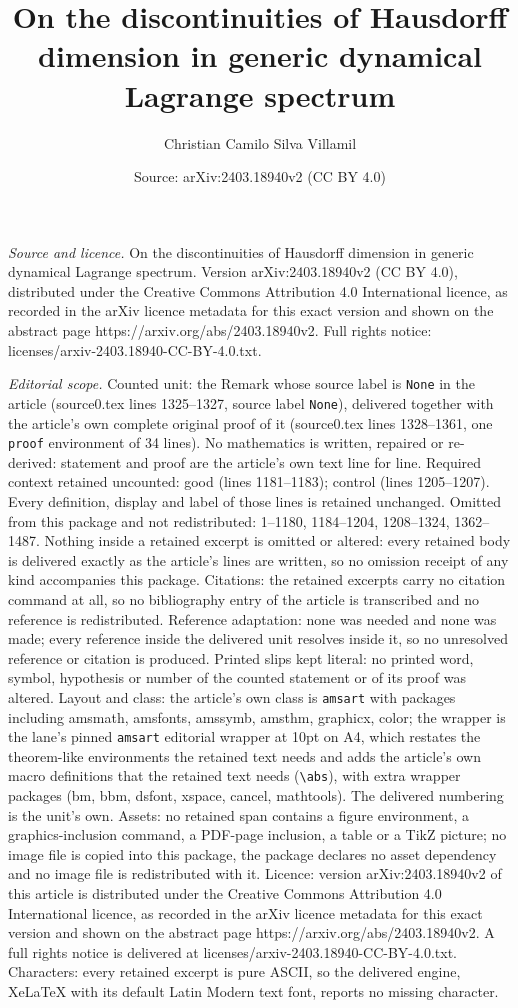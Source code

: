 \documentclass[10pt,a4paper]{amsart}
\title[On the discontinuities of Hausdorff dimension in generic dyn]{On the discontinuities of Hausdorff dimension in generic dynamical Lagrange spectrum}
\author{Christian Camilo Silva Villamil}
\date{Source: arXiv:2403.18940v2 (CC BY 4.0)}
\begin{document}
\maketitle

\noindent\emph{Source and licence.} On the discontinuities of Hausdorff dimension in generic dynamical Lagrange spectrum. Version arXiv:2403.18940v2 (CC BY 4.0), distributed under the Creative Commons Attribution 4.0 International licence, as recorded in the arXiv licence metadata for this exact version and shown on the abstract page https://arxiv.org/abs/2403.18940v2. Full rights notice: licenses/arxiv-2403.18940-CC-BY-4.0.txt.\par\smallskip

\noindent\textit{Editorial scope.} Counted unit: the Remark whose source label is \texttt{None} in the article (source0.tex lines 1325--1327, source label \texttt{None}), delivered together with the article's own complete original proof of it (source0.tex lines 1328--1361, one \texttt{proof} environment of 34 lines). No mathematics is written, repaired or re-derived: statement and proof are the article's own text line for line. Required context retained uncounted: good (lines 1181--1183); control (lines 1205--1207). Every definition, display and label of those lines is retained unchanged. Omitted from this package and not redistributed: 1--1180, 1184--1204, 1208--1324, 1362--1487. Nothing inside a retained excerpt is omitted or altered: every retained body is delivered exactly as the article's lines are written, so no omission receipt of any kind accompanies this package. Citations: the retained excerpts carry no citation command at all, so no bibliography entry of the article is transcribed and no reference is redistributed. Reference adaptation: none was needed and none was made; every reference inside the delivered unit resolves inside it, so no unresolved reference or citation is produced. Printed slips kept literal: no printed word, symbol, hypothesis or number of the counted statement or of its proof was altered. Layout and class: the article's own class is \texttt{amsart} with packages including amsmath, amsfonts, amssymb, amsthm, graphicx, color; the wrapper is the lane's pinned \texttt{amsart} editorial wrapper at 10pt on A4, which restates the theorem-like environments the retained text needs and adds the article's own macro definitions that the retained text needs (\texttt{\textbackslash abs}), with extra wrapper packages (bm, bbm, dsfont, xspace, cancel, mathtools). The delivered numbering is the unit's own. Assets: no retained span contains a figure environment, a graphics-inclusion command, a PDF-page inclusion, a table or a TikZ picture; no image file is copied into this package, the package declares no asset dependency and no image file is redistributed with it. Licence: version arXiv:2403.18940v2 of this article is distributed under the Creative Commons Attribution 4.0 International licence, as recorded in the arXiv licence metadata for this exact version and shown on the abstract page https://arxiv.org/abs/2403.18940v2. A full rights notice is delivered at licenses/arxiv-2403.18940-CC-BY-4.0.txt. Characters: every retained excerpt is pure ASCII, so the delivered engine, XeLaTeX with its default Latin Modern text font, reports no missing character.
\end{document}
